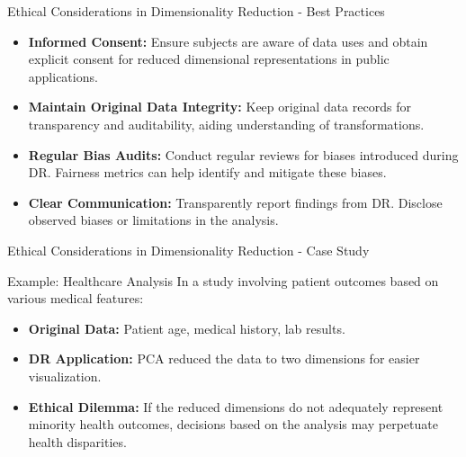 \documentclass[aspectratio=169]{beamer}
\begin{document}
\begin{frame}[fragile]{Ethical Considerations in Dimensionality Reduction - Best Practices}
    \begin{itemize}
        \item \textbf{Informed Consent:} Ensure subjects are aware of data uses and obtain explicit consent for reduced dimensional representations in public applications.
        
        \item \textbf{Maintain Original Data Integrity:} Keep original data records for transparency and auditability, aiding understanding of transformations.
        
        \item \textbf{Regular Bias Audits:} Conduct regular reviews for biases introduced during DR. Fairness metrics can help identify and mitigate these biases.
        
        \item \textbf{Clear Communication:} Transparently report findings from DR. Disclose observed biases or limitations in the analysis.
    \end{itemize}
\end{frame}

\begin{frame}[fragile]{Ethical Considerations in Dimensionality Reduction - Case Study}
    \begin{block}{Example: Healthcare Analysis}
        In a study involving patient outcomes based on various medical features:
        \begin{itemize}
            \item \textbf{Original Data:} Patient age, medical history, lab results.
            \item \textbf{DR Application:} PCA reduced the data to two dimensions for easier visualization.
            \item \textbf{Ethical Dilemma:} If the reduced dimensions do not adequately represent minority health outcomes, decisions based on the analysis may perpetuate health disparities.
        \end{itemize}
    \end{block}
\end{frame}
\end{document}
